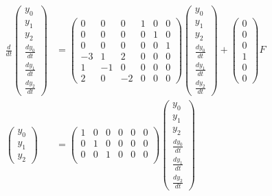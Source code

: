 \documentclass[a4paper,11pt]{jreport}
\begin{document}
\begin{align}
 \frac{d}{dt} \left(\begin{array}{c}
	         y_0 \\
		     y_1 \\
		     y_2 \\
		     \frac{dy_0}{dt} \\
		     \frac{dy_1}{dt} \\
		     \frac{dy_2}{dt}
		    \end{array}\right)
 &=
 \left(\begin{array}{rrrrrr}
        0 & 0 & 0 & 1 & 0 & 0      \\
        0 & 0 & 0 & 0 & 1 & 0      \\
        0 & 0 & 0 & 0 & 0 & 1      \\
	-3& 1 & 2 & 0 & 0 & 0 \\
	1 & -1& 0 & 0 & 0 & 0 \\
	2 & 0 & -2& 0 & 0 & 0 
       \end{array}\right)
 \left(\begin{array}{c}
	         y_0 \\
		     y_1 \\
		     y_2 \\
		     \frac{dy_0}{dt} \\
		     \frac{dy_1}{dt} \\
		     \frac{dy_2}{dt}
       \end{array}\right)
 +
 \left(\begin{array}{c}
        0 \\
        0 \\
        0 \\
	    1 \\
	    0 \\
	    0 
       \end{array}\right)
        F
\nonumber
\\
 \left(\begin{array}{c}
	    y_0 \\
		y_1 \\
		y_2
       \end{array}\right)
 &=
 \left(\begin{array}{rrrrrr}
         1 & 0 & 0 & 0 & 0 & 0  \\
         0 & 1 & 0 & 0 & 0 & 0 \\
         0 & 0 & 1 & 0 & 0 & 0 \\
       \end{array}\right)
 \left(\begin{array}{c}
	         y_0 \\
		     y_1 \\
		     y_2 \\
		     \frac{dy_0}{dt} \\
		     \frac{dy_1}{dt} \\
		     \frac{dy_2}{dt}
       \end{array}\right)
\nonumber
\end{align}
\end{document}
